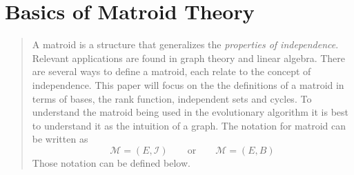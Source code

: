 \documentclass[a4paper, 11pt]{report}
\theoremstyle{remark}
\begin{document}
\section{Basics of Matroid Theory \cite{hillman_matroid_2016}}
    \begin{quote}
        A matroid is a structure that generalizes the \emph{properties of independence}. Relevant applications are found in graph theory and linear algebra. There are several ways to define a matroid, 
        each relate to the concept of independence. This paper will focus on the the definitions of a matroid in terms of bases, the rank function, independent sets and cycles.
        To understand the matroid being used in the evolutionary algorithm it is best to understand it as the intuition of a graph. The notation for 
        matroid can be written as 
        \begin{equation*}
            \mathcal{M} = (E,\mathcal{I})\qquad\text{or}\qquad\mathcal{M} = (E,B)
        \end{equation*}
        Those notation can be defined below.
    \end{quote}
\end{document}
